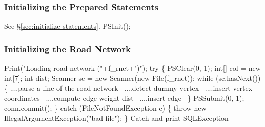 \documentclass{article}
\def\nwendcode{\endtrivlist \endgroup}
\let\nwdocspar=\par
\theoremstyle{definition}
\begin{document}
\subsubsection{Initializing the Prepared Statements}
\label{sec:initializing-the-prepared-statements}
See \S\ref{sec:initialize-statements}.
\nwenddocs{}\endmoddef{}
PSInit();
\nwendcode{}\nwdocspar
\subsubsection{Initializing the Road Network}
\label{sec:initializing-the-road-network}
\nwenddocs{}\endmoddef{}
Print("Loading road network ("+f_rnet+")");
try \{
  PSClear(0, 1);
  int[] col = new int[7];
  int dist;
  Scanner sc = new Scanner(new File(f_rnet));
  while (sc.hasNext()) \{
    \LA{}....parse a line of the road network~{\nwtagstyle{}}\RA{}
    \LA{}....detect dummy vertex~{\nwtagstyle{}}\RA{}
    \LA{}....insert vertex coordinates~{\nwtagstyle{}}\RA{}
    \LA{}....compute edge weight \code{}dist\edoc{}~{\nwtagstyle{}}\RA{}
    \LA{}....insert edge~{\nwtagstyle{}}\RA{}
  \}
  PSSubmit(0, 1);
  conn.commit();
\} catch (FileNotFoundException e) \{
  throw new IllegalArgumentException("bad file");
\}
\LA{}Catch and print \code{}SQLException\edoc{}~{\nwtagstyle{}}\RA{}
\nwendcode{}\nwdocspar
\end{document}
